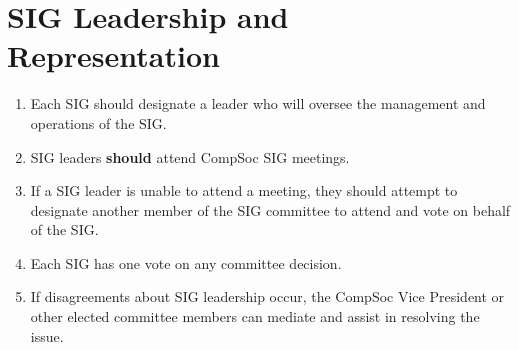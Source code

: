\section{SIG Leadership and Representation}
\begin{enumerate}
\item Each SIG should designate a leader who will oversee the management and operations of the SIG.
\item SIG leaders \textbf{should} attend CompSoc SIG meetings.
\item If a SIG leader is unable to attend a meeting, they should attempt to designate another member of the SIG committee to attend and vote on behalf of the SIG.
\item Each SIG has one vote on any committee decision.
\item If disagreements about SIG leadership occur, the CompSoc Vice President or other elected committee members can mediate and assist in resolving the issue.
\end{enumerate}